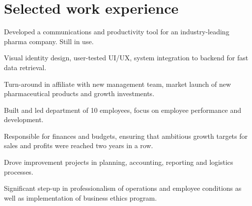 \documentclass[a4paper]{janus-resume}
\begin{document}
\begin{minipage}[t]{0.49\textwidth} %


\section{Selected work experience}
%
\runsubsection{}
\vspace{\topsep} %
\begin{tightitemize}
\item Developed a communications and productivity tool for an industry-leading pharma company. Still in use.
\item Visual identity design, user-tested UI/UX, system integration to backend for fast data retrieval.
\end{tightitemize}
\sectionspace %

\begin{tightitemize}
\item Turn-around in affiliate with new management team, market launch of new pharmaceutical products and growth investments.
\item Built and led department of 10 employees, focus on employee performance and development.
\item Responsible for finances and budgets, ensuring that ambitious growth targets for sales and profits were reached two years in a row.
\item Drove improvement projects in planning, accounting, reporting and logistics processes.
\item Significant step-up in professionalism of operations and employee conditions as well as implementation of business ethics program. 
\end{tightitemize}

\sectionspace %



\end{minipage}
\end{document}
